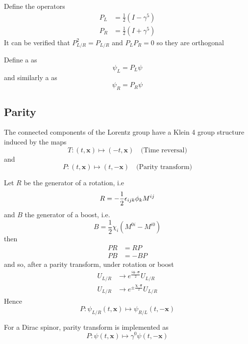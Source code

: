 \documentclass{article}
\begin{document}
\begin{definition}
Define the operators 
\begin{align*}
    P_L &= \frac{1}{2}(I-\gamma^5) \\
    P_R &= \frac{1}{2}(I+\gamma^5) 
\end{align*}
It can be verified that $P_{L/R}^2=P_{L/R}$ and $P_L P_R =0$ so they are orthogonal 
\end{definition}

\begin{definition}
Define a  as 
\[
\psi_L=P_L \psi
\]
and similarly a  as 
\[
\psi_R=P_R \psi
\]
\end{definition}

\subsection{Parity}

\begin{fact}
The connected components of the Lorentz group have a Klein 4 group structure induced by the maps 
\[
T: (t,\bm{x}) \mapsto (-t,\bm{x}) \quad \text{(Time reversal)}
\]
and
\[
P: (t,\bm{x}) \mapsto (t, -\bm{x}) \quad \text{(Parity transform)}
\]
\end{fact}
\begin{fact}
Let $R$ be the generator of a rotation, i.e 
\[
R=-\frac{1}{2}\epsilon_{ijk}\phi_k M^{ij}
\]
and $B$ the generator of a boost, i.e. 
\[
B=\frac{1}{2}\chi_i (M^{0i}-M^{i0})
\]
then
\begin{align*}
    PR &= RP \\
    PB &= -BP 
\end{align*}
and so, after a parity transform, under rotation or boost
\begin{align*}
    U_{L/R} &\to e^{\frac{i\bm{\phi}\cdot\bm{\sigma}}{2}} U_{L/R} \\ 
    U_{L/R} &\to e^{\pm\frac{\bm{\chi}\cdot\bm{\sigma}}{2}} U_{L/R}
\end{align*}
Hence 
\[
P:\psi_{L/R}(t,\bm{x}) \mapsto \psi_{R/L}(t,-\bm{x})
\]
\end{fact}

\begin{fact}
For a Dirac spinor, parity transform is implemented as 
\[
P: \psi(t,\bm{x}) \mapsto \gamma^0 \psi(t,-\bm{x})
\]
\end{fact}
\end{document}
